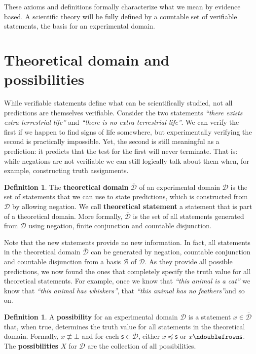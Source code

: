\documentclass[letterpaper]{article}
\theoremstyle{plain}%
\theoremstyle{definition}
\newtheorem{defn}[thrm]{Definition}
\theoremstyle{remark}
\def\contradiction{\bot}
\def\ncomp{\ndoublefrown}
\def\narrower{\preccurlyeq}
\newcommand{\edomain}[1][D] {\mathcal{#1}}
\newcommand{\tdomain}[1][D] {\bar{\mathcal{#1}}}
\newcommand{\basis}[1][B] {\mathcal{#1}} %
\newcommand{\statement}[1] {\emph{``#1''}}
\begin{document}
These axioms and definitions formally characterize what we mean by evidence based. A scientific theory will be fully defined by a countable set of verifiable statements, the basis for an experimental domain.

\section{Theoretical domain and possibilities}

While verifiable statements define what can be scientifically studied, not all predictions are themselves verifiable. Consider the two statements \statement{there exists extra-terrestrial life} and \statement{there is no extra-terrestrial life}. We can verify the first if we happen to find signs of life somewhere, but experimentally verifying the second is practically impossible. Yet, the second is still meaningful as a prediction: it predicts that the test for the first will never terminate. That is: while negations are not verifiable we can still logically talk about them when, for example, constructing truth assignments.

\begin{defn}
	The \textbf{theoretical domain} $\tdomain$ of an experimental domain $\edomain$ is the set of statements that we can use to state predictions, which is constructed from $\edomain$ by allowing negation. We call \textbf{theoretical statement} a statement that is part of a theoretical domain. More formally, $\tdomain$ is the set of all statements generated from $\edomain$ using negation, finite conjunction and countable disjunction.
\end{defn}

Note that the new statements provide no new information. In fact, all statements in the theoretical domain $\tdomain$ can be generated by negation, countable conjunction and countable disjunction from a basis $\basis$ of $\edomain$. As they provide all possible predictions, we now found the ones that completely specify the truth value for all theoretical statements. For example, once we know that \statement{this animal is a cat} we know that \statement{this animal has whiskers}, that \statement{this animal has no feathers}and so on.

\begin{defn}
	A \textbf{possibility} for an experimental domain $\edomain$ is a statement $x \in \tdomain$ that, when true, determines the truth value for all statements in the theoretical domain. Formally, $x \nequiv \contradiction$ and for each $\mathsf{s} \in \tdomain$, either $x \narrower \mathsf{s}$ or $x \ncomp \mathsf{s}$. The \textbf{possibilities} $X$ for $\edomain$ are the collection of all possibilities.
\end{defn}
\end{document}
